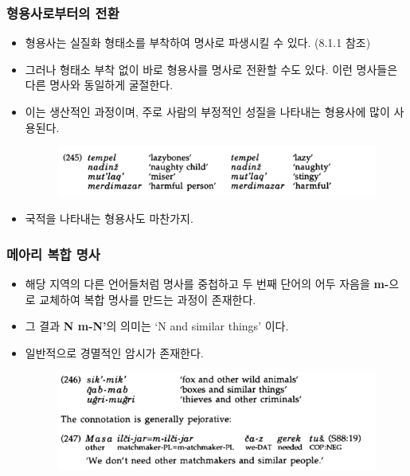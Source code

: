\subsubsection{형용사로부터의 전환}
\begin{itemize}
\item 형용사는 실질화 형태소를 부착하여 명사로 파생시킬 수 있다. (8.1.1 참조)
\item 그러나 형태소 부착 없이 바로 형용사를 명사로 전환할 수도 있다. 이런 명사들은 다른 명사와 동일하게 굴절한다.
\item 이는 생산적인 과정이며, 주로 사람의 부정적인 성질을 나타내는 형용사에 많이 사용된다.
\begin{figure}[H]
\centerline{\includegraphics[width=.8\linewidth]{Lezgian/src/ex245.png}}
\end{figure}
\item 국적을 나타내는 형용사도 마찬가지.
\end{itemize}

\subsubsection{메아리 복합 명사}
\begin{itemize}
\item 해당 지역의 다른 언어들처럼 명사를 중첩하고 두 번째 단어의 어두 자음을 \textbf{m-}으로 교체하여 복합 명사를 만드는 과정이 존재한다. 
\item 그 결과 \textbf{N m-N'}의 의미는 `N and similar things' 이다.
\item 일반적으로 경멸적인 암시가 존재한다.
\begin{figure}[H]
\centerline{\includegraphics[width=.8\linewidth]{Lezgian/src/ex7-3-4.png}}
\end{figure}
\end{itemize}















